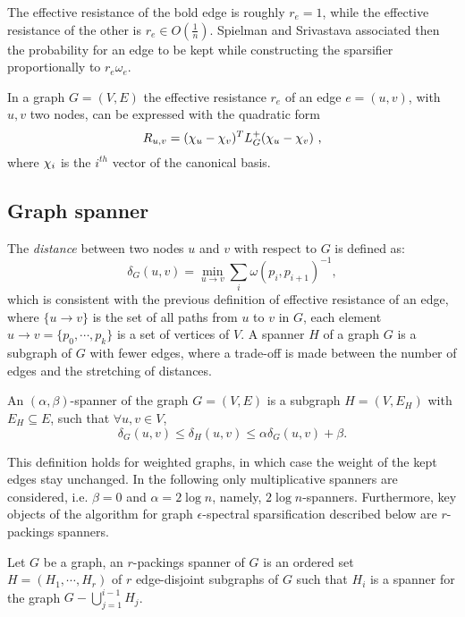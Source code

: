 The effective resistance of the bold edge is roughly $r_e = 1$, while the
effective resistance of the other is $r_e \in O(\frac{1}{n})$. Spielman and
Srivastava associated then the probability for an edge to be kept while
constructing the sparsifier proportionally to $r_e \omega_e$.

In a graph $G=(V,E)$ the effective resistance $r_e$ of an edge $e=(u,v)$, with $u,v$ two nodes,
can be expressed with the quadratic form
\begin{equation}\label{eq:effective-resistance}
   R_{u,v} = (\chi_u - \chi_v)^TL_G^+(\chi_u - \chi_v) \text{ ,}
\end{equation}
where $\chi_i$ is the $i^{th}$ vector of the canonical basis. \cite{spielman_graph_2011}


\subsection{Graph spanner}
The \textit{distance} between two nodes $u$ and $v$ with respect to $G$ is
defined as:
\begin{equation*}
    \delta_G(u,v) = \min_{u\rightarrow v} \sum_{i} \omega(p_{i}, p_{i+1})^{-1},
\end{equation*}
which is consistent with the previous definition of effective resistance of an
edge, where $\{ u\rightarrow v\}$ is the set of all paths from $u$ to $v$ in
$G$, each element $u\rightarrow v = \{p_0, \cdots, p_k\}$ is a set of vertices
of $V$. A spanner $H$ of a graph $G$ is a subgraph of $G$ with fewer edges,
where a trade-off is made between the number of edges and the stretching of
distances.
\begin{definition}
    An $(\alpha,\beta)$-spanner of the graph $G=(V,E)$ is a subgraph $H = (V,
    E_H)$ with $E_H \subseteq E$, such that $\forall u, v \in V$,
    \begin{equation*}
        \delta_G(u,v) \leq \delta_H(u,v) \leq \alpha\delta_G(u,v) + \beta.
    \end{equation*}
\end{definition}
This definition holds for weighted graphs, in which case the weight of the kept
edges stay unchanged. In the following only multiplicative spanners are
considered, i.e. $\beta = 0$ and $\alpha = 2 \log n$, namely, $2\log
n$-spanners. Furthermore, key objects of the algorithm for graph
$\epsilon$-spectral sparsification described below are $r$-packings spanners.
\begin{definition}\label{def:packing-spanner}
    Let $G$ be a graph, an $r$-packings spanner of $G$ is an ordered set $H=(H_1,
    \cdots, H_r)$ of $r$ edge-disjoint subgraphs of $G$ such that $H_i$ is a
    spanner for the graph $G - \bigcup_{j=1}^{i-1} H_j$.
\end{definition}

